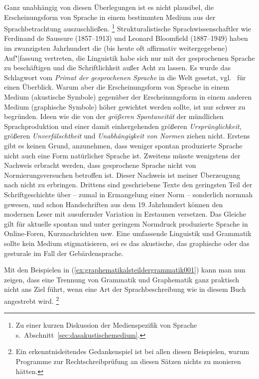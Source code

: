 Ganz unabhängig von diesen Überlegungen ist es nicht plausibel, die Erscheinungsform von Sprache in einem bestimmten Medium aus der Sprachbetrachtung auszuschließen.%
\footnote{Zu einer kurzen Diskussion der Medienspezifik von Sprache s.\ Abschnitt~\ref{sec:dasakustischemedium}.}
Strukturalistische Sprachwissenschaftler wie Ferdinand de Saussure (1857--1913) und Leonard Bloomfield (1887--1949) haben im zwanzigsten Jahrhundert die (bis heute oft affirmativ weitergegebene) Auf"|fassung vertreten, die Linguistik habe sich nur mit der gesprochenen Sprache zu beschäftigen und die Schriftlichkeit außer Acht zu lassen.
Es wurde das Schlagwort vom \textit{Primat der gesprochenen Sprache} in die Welt gesetzt, vgl.\ \cite[Kapitel~0]{Duerscheid2012a} für einen Überblick.
Warum aber die Erscheinungsform von Sprache in einem Medium (akustische Symbole) gegenüber der Erscheinungsform in einem anderen Medium (graphische Symbole) höher gewichtet werden sollte, ist nur schwer zu begründen.
Ideen wie die von der \textit{größeren Spontaneität} der mündlichen Sprachproduktion und einer damit einhergehenden größeren \textit{Ursprünglichkeit}, größeren \textit{Unverfälschtheit} und \textit{Unabhängigkeit von Normen} ziehen nicht.
Erstens gibt es keinen Grund, anzunehmen, dass weniger spontan produzierte Sprache nicht auch eine Form natürlicher Sprache ist.
Zweitens müsste wenigstens der Nachweis erbracht werden, dass gesprochene Sprache nicht von Normierungsversuchen betroffen ist.
Dieser Nachweis ist meiner Überzeugung nach nicht zu erbringen.
Drittens sind geschriebene Texte den geringsten Teil der Schriftgeschichte über -- zumal in Ermangelung einer Norm -- sonderlich normnah gewesen, und schon Handschriften aus dem 19.\,Jahrhundert können den modernen Leser mit ausufernder Variation in Erstaunen versetzen.
Das Gleiche gilt für aktuelle spontan und unter geringem Normdruck produzierte Sprache in Online-Foren, Kurznachrichten usw.
Eine umfassende Linguistik und Grammatik sollte kein Medium stigmatisieren, sei es das akustische, das graphische oder \zB das gesturale im Fall der Gebärdensprache.

Mit den Beispielen in (\ref{ex:graphematikalsteildergrammatik001}) kann man nun zeigen, dass eine Trennung von Grammatik und Graphematik ganz praktisch nicht ans Ziel führt, wenn eine Art der Sprachbeschreibung wie in diesem Buch angestrebt wird.%
\footnote{Ein erkenntnisleitendes Gedankenspiel ist bei allen diesen Beispielen, warum Programme zur Rechtschreibprüfung an diesen Sätzen nichts zu monieren hätten.}

